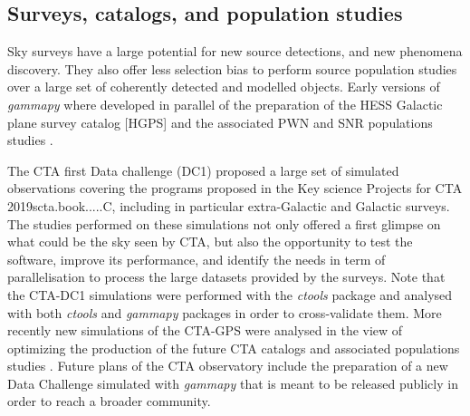 \subsection{Surveys, catalogs, and population studies}

Sky surveys have a large potential for new source detections, and new phenomena discovery. They also offer less selection bias to perform source population studies over a large set of coherently detected and modelled objects.
Early versions of \textit{gammapy} where developed in parallel of the preparation of the HESS Galactic plane survey catalog [HGPS]\citep {2018A&A...612A...1H} and the associated PWN and SNR populations studies \citep{2018A&A...612A...2H, 2018A&A...612A...3H}.

The CTA first Data challenge (DC1) proposed a large set of simulated observations covering the programs proposed in the Key science Projects for CTA  {2019scta.book.....C}, including in particular extra-Galactic and Galactic surveys.
The studies performed on these simulations not only offered a first glimpse on what could be the sky seen by CTA, but also the opportunity to test the software, improve its performance, and identify the needs in term of parallelisation to process the large datasets provided by the surveys. Note that the CTA-DC1 simulations were performed with the \textit{ctools} package \citep{2016A&A...593A...1K} and analysed with both \textit{ctools} and \textit{gammapy} packages in order to cross-validate them. More recently new simulations of the CTA-GPS were analysed in the view of optimizing the production of the future CTA catalogs and associated populations studies \citep{2021arXiv210903729R}.
Future plans of the CTA observatory include the preparation of a new Data Challenge simulated with \textit{gammapy} that is meant to be released publicly in order to reach a broader community.
